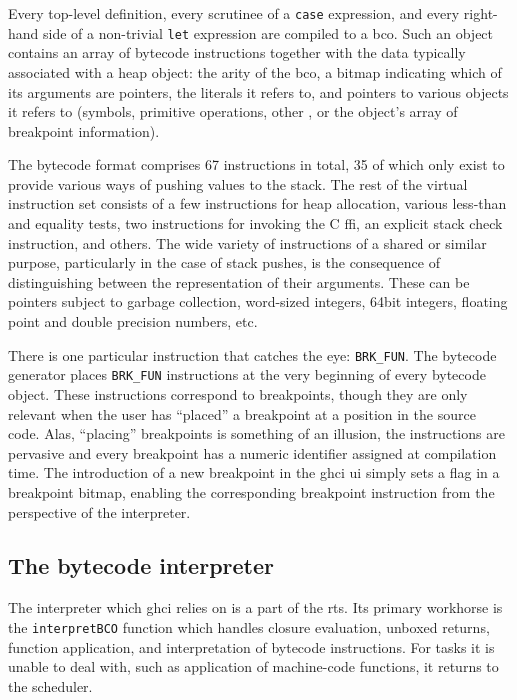 \documentclass[thesis=B,english]{FITthesis}[2019/12/23]
\newcommand{\hsCode}[1]{\texttt{#1}}
\begin{document}
Every top-level definition, every scrutinee of a \hsCode{case} expression, and
every right-hand side of a non-trivial \hsCode{let} expression are compiled to
a \acrfull{bco}. Such an object contains an array of bytecode instructions
together with the data typically associated with a heap object: the arity of
the \acrshort{bco}, a bitmap indicating which of its arguments are pointers,
the literals it refers to, and pointers to various objects it refers to
(symbols, primitive operations, other , or the object's array
of breakpoint information).

The bytecode format comprises 67 instructions in total, 35 of which only exist
to provide various ways of pushing values to the stack. The rest of the virtual
instruction set consists of a few instructions for heap allocation, various
less-than and equality tests, two instructions for invoking the C
\acrshort{ffi}, an explicit stack check instruction, and others. The wide
variety of instructions of a shared or similar purpose, particularly in the
case of stack pushes, is the consequence of distinguishing between the
representation of their arguments. These can be pointers subject to garbage
collection, word-sized integers, 64bit integers, floating point and double
precision numbers, etc.

There is one particular instruction that catches the eye: \texttt{BRK\_FUN}.
The bytecode generator places \texttt{BRK\_FUN} instructions at the very
beginning of every bytecode object. These instructions correspond to
breakpoints, though they are only relevant when the user has ``placed'' a
breakpoint at a position in the source code. Alas, ``placing'' breakpoints is
something of an illusion, the instructions are pervasive and every breakpoint
has a numeric identifier assigned at compilation time. The introduction of a
new breakpoint in the \acrshort{ghci} \acrshort{ui} simply sets a flag in a
breakpoint bitmap, enabling the corresponding breakpoint instruction from the
perspective of the interpreter.


\subsection*{The bytecode interpreter}
The interpreter which \acrshort{ghci} relies on is a part of the
\acrshort{rts}. Its primary workhorse is the \texttt{interpretBCO} function
which handles closure evaluation, unboxed returns, function application, and
interpretation of bytecode instructions. For tasks it is unable to deal with,
such as application of machine-code functions, it returns to the scheduler.
\end{document}
